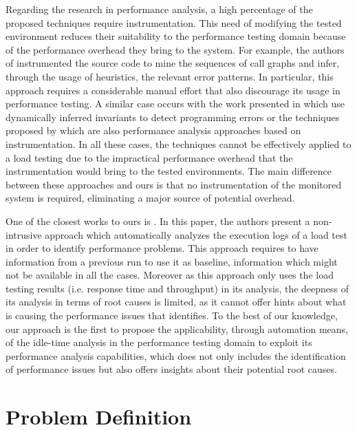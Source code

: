 \documentclass[runningheads,a4paper]{llncs}
\begin{document}
Regarding the research in performance analysis, a high percentage of
the proposed techniques require instrumentation. This need of modifying the
tested environment reduces their suitability to the performance testing domain
because of the performance overhead they bring to the system. For example, the
authors of \cite{Yang1} instrumented the source code to mine the sequences of
call graphs and infer, through the usage of heuristics, the relevant error
patterns. In particular, this approach requires a considerable manual effort
that also discourage its usage in performance testing. A similar case occurs
with the work presented in\cite{Hangal1,Csallner1} which use dynamically
inferred invariants to detect programming errors or the techniques proposed by
\cite{Barham1,Chen2} which are also performance analysis approaches based on instrumentation. 
In all these cases, the techniques cannot be effectively applied to a
load testing due to the impractical performance overhead that the
instrumentation would bring to the tested environments. The main difference between 
these approaches and ours is that no instrumentation of the monitored system is 
required, eliminating a major source of potential overhead.

One of the closest works to ours is \cite{Jiang2009}. In this paper, the authors
present a non-intrusive approach which automatically analyzes the execution logs
of a load test in order to identify performance problems. This approach requires to have
information from a previous run to use it as baseline, information which might
not be available in all the cases. Moreover as this approach only uses 
the load testing results (i.e. response time and throughput) in its analysis,
the deepness of its analysis in terms of root causes is limited, as it cannot offer 
hints about what is causing the performance issues that identifies. To the best of 
our knowledge, our approach is the first to propose the applicability, through
automation means, of the idle-time analysis in the performance testing domain to exploit 
its performance analysis capabilities, which does not only includes the
identification of performance issues but also offers insights about their
potential root causes.


\section{Problem Definition}
\end{document}
